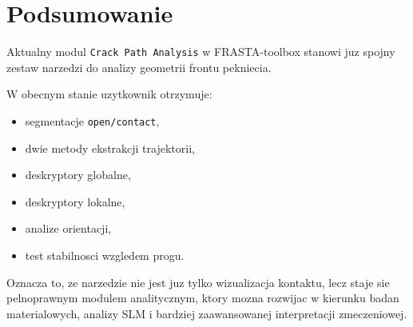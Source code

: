 \documentclass[11pt,a4paper]{article}
\begin{document}
\section{Podsumowanie}

Aktualny modul \texttt{Crack Path Analysis} w FRASTA-toolbox stanowi juz
spojny zestaw narzedzi do analizy geometrii frontu pekniecia.

W obecnym stanie uzytkownik otrzymuje:

\begin{itemize}[leftmargin=1.5em]
    \item segmentacje \texttt{open/contact},
    \item dwie metody ekstrakcji trajektorii,
    \item deskryptory globalne,
    \item deskryptory lokalne,
    \item analize orientacji,
    \item test stabilnosci wzgledem progu.
\end{itemize}

Oznacza to, ze narzedzie nie jest juz tylko wizualizacja kontaktu, lecz staje
sie pelnoprawnym modulem analitycznym, ktory mozna rozwijac w kierunku badan
materialowych, analizy SLM i bardziej zaawansowanej interpretacji zmeczeniowej.
\end{document}
